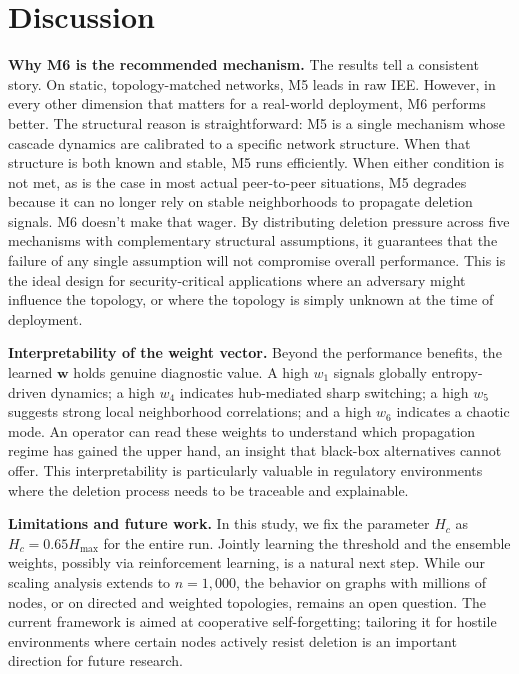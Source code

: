 \documentclass[conference]{IEEEtran}
\newcommand{\bfw}{\mathbf{w}}
\newcommand{\Hc}{H_c}
\newcommand{\Hmax}{H_{\max}}
\begin{document}


\section{Discussion}
\label{sec:discussion}

\textbf{Why M6 is the recommended mechanism.}
The results tell a consistent story. On static, topology-matched networks, M5 leads in raw IEE. 
However, in every other dimension that matters for a real-world deployment, M6 performs better. 
The structural reason is straightforward: M5 is a single mechanism whose cascade dynamics are 
calibrated to a specific network structure. When that structure is both known and stable, 
M5 runs efficiently. When either condition is not met, as is the case in most actual peer-to-peer
situations, M5 degrades because it can no longer rely on stable neighborhoods to propagate deletion signals. 
M6 doesn't make that wager. By distributing deletion pressure across five mechanisms with complementary structural assumptions, 
it guarantees that the failure of any single assumption will not compromise overall performance.
 This is the ideal design for security-critical applications where an adversary might influence the topology,
or where the topology is simply unknown at the time of deployment.

\textbf{Interpretability of the weight vector.}
Beyond the performance benefits, the learned $\bfw$ holds genuine diagnostic value. 
A high $w_1$ signals globally entropy-driven dynamics; a high $w_4$ indicates hub-mediated sharp switching;
a high $w_5$ suggests strong local neighborhood correlations; 
and a high $w_6$ indicates a chaotic mode. 
An operator can read these weights to understand which propagation regime has gained
 the upper hand, an insight that black-box alternatives cannot offer. 
 This interpretability is particularly valuable in regulatory environments where the deletion
  process needs to be traceable and explainable.

\textbf{Limitations and future work.}
In this study, we fix the parameter $\Hc$ as $\Hc=0.65\Hmax$ for the entire run. 
Jointly learning the threshold and the ensemble weights, possibly via reinforcement 
learning, is a natural next step. While our scaling analysis extends to $n=1,000$, 
the behavior on graphs with millions of nodes, or on directed and weighted topologies, 
remains an open question. The current framework is aimed at cooperative self-forgetting; 
tailoring it for hostile environments where certain nodes actively resist deletion is an important direction for future research.
\end{document}
